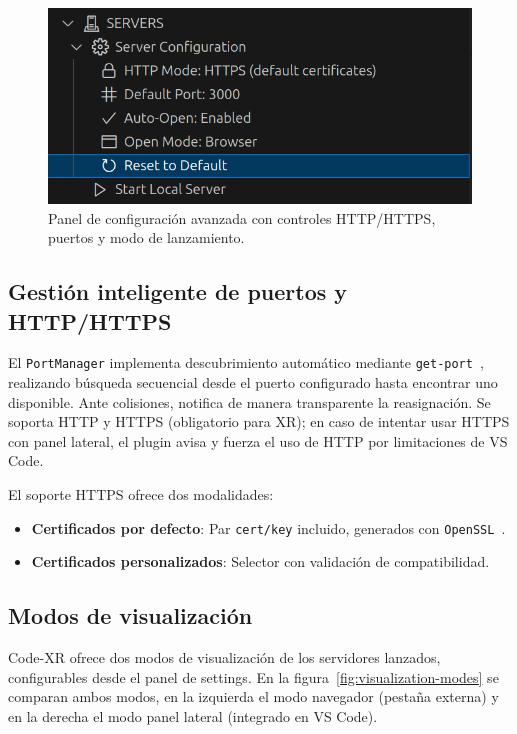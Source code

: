 \documentclass[a4paper, 12pt]{book}
\begin{document}
\begin{figure}[H]
\centering
\includegraphics[width=0.65\linewidth]{img/ui-server-config.png}
\caption{Panel de configuración avanzada con controles HTTP/HTTPS, puertos y modo de lanzamiento.}
\label{fig:ui-server-config}
\end{figure}

\subsection{Gestión inteligente de puertos y HTTP/HTTPS}
El \texttt{PortManager} implementa descubrimiento automático mediante \texttt{get-port}~\cite{get-port}, realizando búsqueda secuencial desde el puerto configurado hasta encontrar uno disponible. Ante colisiones, notifica de manera transparente la reasignación.
Se soporta HTTP y HTTPS (obligatorio para XR); en caso de intentar usar HTTPS con panel lateral, el plugin avisa y fuerza el uso de HTTP por limitaciones de VS Code.

El soporte HTTPS ofrece dos modalidades:
\begin{itemize}
  \item \textbf{Certificados por defecto}: Par \texttt{cert/key} incluido, generados con \texttt{OpenSSL}~\cite{openssl}.
  \item \textbf{Certificados personalizados}: Selector con validación de compatibilidad.
\end{itemize}

\subsection{Modos de visualización}
Code-XR ofrece dos modos de visualización de los servidores lanzados, configurables desde el panel de settings. En la figura~\ref{fig:visualization-modes} se comparan ambos modos, en la izquierda el modo navegador (pestaña externa) y en la derecha el modo panel lateral (integrado en VS Code).
\end{document}
